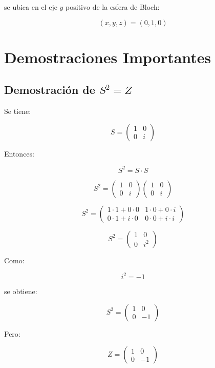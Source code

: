 \documentclass[12pt,a4paper]{article}
\begin{document}
se ubica en el eje \(y\) positivo de la esfera de Bloch:

\[
(x,y,z)=(0,1,0)
\]

\section{Demostraciones Importantes}

\subsection{Demostración de \texorpdfstring{$S^2=Z$}{S2=Z}}

Se tiene:

\[
S=
\begin{pmatrix}
1 & 0\\
0 & i
\end{pmatrix}
\]

Entonces:

\[
S^2=S\cdot S
\]

\[
S^2=
\begin{pmatrix}
1 & 0\\
0 & i
\end{pmatrix}
\begin{pmatrix}
1 & 0\\
0 & i
\end{pmatrix}
\]

\[
S^2=
\begin{pmatrix}
1\cdot 1+0\cdot 0 & 1\cdot 0+0\cdot i\\
0\cdot 1+i\cdot 0 & 0\cdot 0+i\cdot i
\end{pmatrix}
\]

\[
S^2=
\begin{pmatrix}
1 & 0\\
0 & i^2
\end{pmatrix}
\]

Como:

\[
i^2=-1
\]

se obtiene:

\[
S^2=
\begin{pmatrix}
1 & 0\\
0 & -1
\end{pmatrix}
\]

Pero:

\[
Z=
\begin{pmatrix}
1 & 0\\
0 & -1
\end{pmatrix}
\]
\end{document}
